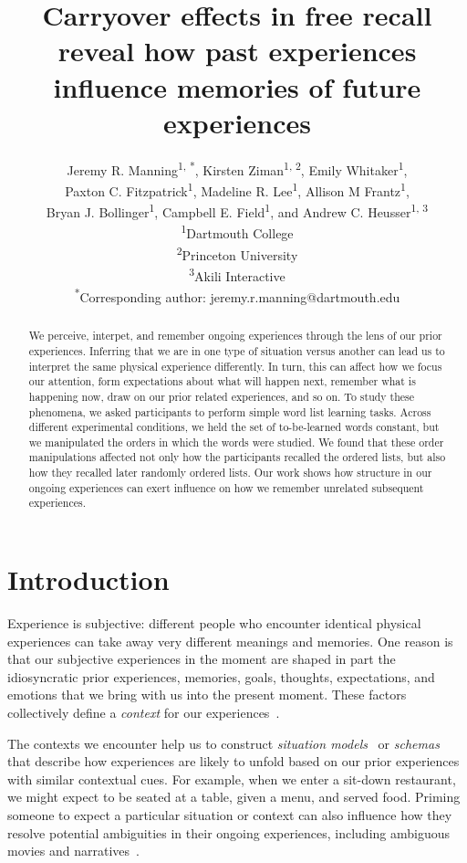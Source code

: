 \documentclass[11pt]{article}
\title{Carryover effects in free recall reveal how past experiences influence
memories of future experiences}
\author{Jeremy R. Manning\textsuperscript{1, *}, Kirsten
Ziman\textsuperscript{1, 2}, Emily Whitaker\textsuperscript{1},\\Paxton C.
Fitzpatrick\textsuperscript{1}, Madeline R. Lee\textsuperscript{1}, Allison M
Frantz\textsuperscript{1},\\Bryan J. Bollinger\textsuperscript{1}, Campbell E.
Field\textsuperscript{1}, and Andrew C. Heusser\textsuperscript{1,
3}\\\textsuperscript{1}Dartmouth College\\\textsuperscript{2}Princeton
University\\\textsuperscript{3}Akili
Interactive\\\textsuperscript{*}Corresponding author:
jeremy.r.manning@dartmouth.edu}
\date{}
\begin{document}
\maketitle

\begin{abstract} We perceive, interpet, and remember ongoing experiences
through the lens of our prior experiences. Inferring that we are in one type of
situation versus another can lead us to interpret the same physical experience
differently. In turn, this can affect how we focus our attention, form
expectations about what will happen next, remember what is happening now, draw on
our prior related experiences, and so on. To study these phenomena, we asked
participants to perform simple word list learning tasks. Across different
experimental conditions, we held the set of to-be-learned words constant, but
we manipulated the orders in which the words were studied. We found that these
order manipulations affected not only how the participants recalled the ordered
lists, but also how they recalled later randomly ordered lists. Our work shows
how structure in our ongoing experiences can exert influence on how we remember
unrelated subsequent experiences. \end{abstract}


\section*{Introduction}


Experience is subjective: different people who encounter identical physical
experiences can take away very different meanings and memories. One reason is
that our subjective experiences in the moment are shaped in part the
idiosyncratic prior experiences, memories, goals, thoughts, expectations, and
emotions that we bring with us into the present moment. These factors
collectively define a \textit{context} for our experiences~\citep{Mann20}. 


The contexts we encounter help us to construct \textit{situation
models}~\citep{RangRitc12, MannEtal15} or \textit{schemas}~\citep{MasiEtal22,
BaldEtal18} that describe how experiences are likely to unfold based on our
prior experiences with similar contextual cues. For example, when we enter a
sit-down restaurant, we might expect to be seated at a table, given a menu, and
served food. Priming someone to expect a particular situation or context can
also influence how they resolve potential ambiguities in their ongoing
experiences, including ambiguous movies and narratives~\citep{YeshEtal17}.
\end{document}

